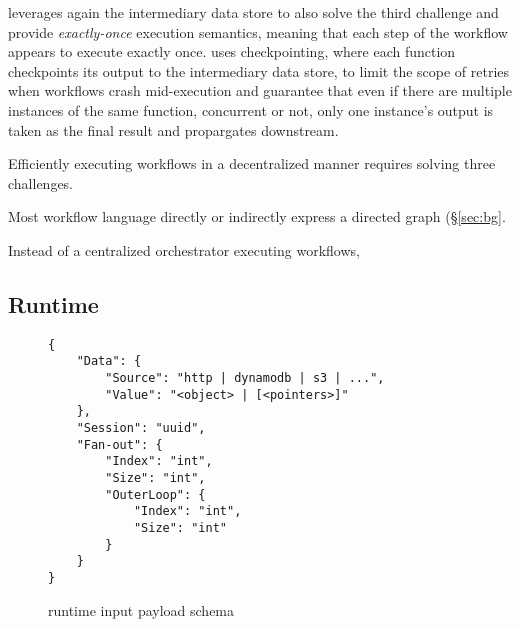 \name{} leverages again the intermediary data store to also solve the third
challenge and provide \emph{exactly-once} execution semantics, meaning that
each step of the workflow appears to execute exactly once. \name{} uses
checkpointing, where each function checkpoints its output to the intermediary
data store, to limit the scope of retries when workflows crash mid-execution
and guarantee that even if there are multiple instances of the same function,
concurrent or not, only one instance's output is taken as the final result and
propargates downstream.













Efficiently executing workflows in a
decentralized manner requires solving three challenges.

Most workflow language directly or indirectly express a directed graph
(\S\ref{sec:bg}.

Instead of a centralized orchestrator executing workflows, \name{}



\subsection{\name{} Runtime}

\begin{figure}[]
    \begin{verbatim}
{
    "Data": {
        "Source": "http | dynamodb | s3 | ...",
        "Value": "<object> | [<pointers>]"
    },
    "Session": "uuid",
    "Fan-out": {
        "Index": "int",
        "Size": "int",
        "OuterLoop": {
            "Index": "int",
            "Size": "int"
        }
    }
}
    \end{verbatim}
    \caption{\name{} runtime input payload schema}
    \label{fig:input-format}
\end{figure}

